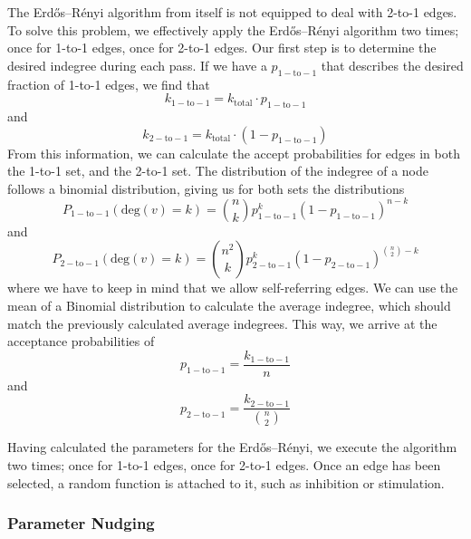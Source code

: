 \documentclass[../main.tex]{subfiles}
\begin{document}
The Erdős–Rényi algorithm from itself is not equipped to deal with 2-to-1 edges.
To solve this problem, we effectively apply the Erdős–Rényi algorithm two times; once for 1-to-1 edges, once for 2-to-1 edges.
Our first step is to determine the desired indegree during each pass.
If we have a $p_\mathrm{1-to-1}$ that describes the desired fraction of 1-to-1 edges, we find that
%
\begin{equation}
k_\mathrm{1-to-1} = k_\mathrm{total} \cdot p_\mathrm{1-to-1}
\end{equation}
%
and
%
\begin{equation}
k_\mathrm{2-to-1} = k_\mathrm{total} \cdot (1 - p_\mathrm{1-to-1})
\end{equation}
%
From this information, we can calculate the accept probabilities for edges in both the 1-to-1 set, and the 2-to-1 set.
The distribution of the indegree of a node follows a binomial distribution, giving us for both sets the distributions
%
\begin{equation}
P_\mathrm{1-to-1} (\mathrm{deg}(v) = k) = \binom{n}{k} p_\mathrm{1-to-1}^k (1 - p_\mathrm{1-to-1})^{n-k}
\end{equation}
%
and
%
\begin{equation}
P_\mathrm{2-to-1} (\mathrm{deg}(v) = k) = \binom{n^2}{k} p_\mathrm{2-to-1}^k (1 - p_\mathrm{2-to-1})^{\binom{n}{2}-k}
\end{equation}
%
where we have to keep in mind that we allow self-referring edges.
We can use the mean of a Binomial distribution to calculate the average indegree, which should match the previously calculated average indegrees.
This way, we arrive at the acceptance probabilities of
%
\begin{equation}
p_\mathrm{1-to-1} = \frac{k_\mathrm{1-to-1}}{n}
\end{equation}
%
and
%
\begin{equation}
p_\mathrm{2-to-1} = \frac{k_\mathrm{2-to-1}}{\binom{n}{2}}
\end{equation}

Having calculated the parameters for the Erdős–Rényi, we execute the algorithm two times; once for 1-to-1 edges, once for 2-to-1 edges.
Once an edge has been selected, a random function is attached to it, such as inhibition or stimulation.

\subsubsection{Parameter Nudging}
\end{document}
